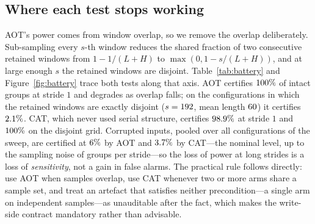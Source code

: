 \documentclass[a4paper,fleqn]{cas-sc}
\newcommand{\fitwidth}[1]{%
  \resizebox{\ifdim\width>\linewidth \linewidth\else \width\fi}{!}{#1}}
\begin{document}
\begin{table}[t]
\centering
\caption{CAT under controlled cross-arm order sharing, \NumCatCondGroups{} groups
per condition. The diagnostic works only when all four permutations are drawn
independently; a single shared pair among four arms defeats it. Generated by
\texttt{tools/make\_cat\_revision.py}; source
\texttt{artifacts/cat\_conditions.csv}.}
\label{tab:catcond}
\fitwidth{}
\end{table}

\subsection{Where each test stops working}
\label{sec:res-battery}

AOT's power comes from window overlap, so we remove the overlap deliberately.
Sub-sampling every $s$-th window reduces the shared fraction of two consecutive
retained windows from $1 - 1/(L+H)$ to $\max(0, 1 - s/(L+H))$, and at large enough
$s$ the retained windows are disjoint. Table~\ref{tab:battery} and
Figure~\ref{fig:battery} trace both tests along that axis. AOT certifies
$100\%$ of intact groups at stride $1$ and degrades as overlap
falls; on the \NumBatDisjointRows{} configurations in which the retained windows
are exactly disjoint ($s = 192{}$, mean length
$60{}$) it certifies $2.1\%$. CAT, which never used
serial structure, certifies $98.9\%$ at stride $1$ and
$100\%$ on the disjoint grid. Corrupted inputs, pooled over all
\NumBatRows{} configurations of the sweep, are certified at
$6\%$ by AOT and $3.7\%$ by CAT---the nominal
level, up to the sampling noise of \NumBatGroups{} groups per stride---so the loss
of power at long strides is a loss of \emph{sensitivity}, not a gain in false
alarms. The practical rule follows directly: use AOT when samples overlap, use CAT
whenever two or more arms share a sample set, and treat an artefact that satisfies
neither precondition---a single arm on independent samples---as unauditable after
the fact, which makes the write-side contract mandatory rather than advisable.

\begin{table}[t]
\centering
\caption{The battery against loss of overlap. \emph{Overlap} is the mean shared
fraction of consecutive retained windows; \emph{clean} and \emph{perm.} are
certification rates (\%) on intact and permuted vectors; the permuted columns
estimate the nominal $5\%$ level from \NumBatGroups{} groups per stride, so their
per-row noise is large while the pooled rate quoted in the body is not. Generated from
\texttt{artifacts/battery.csv}.}
\label{tab:battery}
\fitwidth{}
\end{table}
\end{document}
